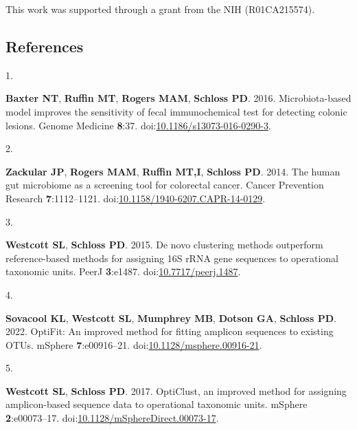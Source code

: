 \documentclass[
]{article}
\newlength{\cslhangindent}
\newlength{\csllabelwidth}
\newlength{\cslentryspacingunit} %
\newenvironment{CSLReferences}[2] %
 {%
  \setlength{\parindent}{0pt}
  \ifodd #1
  \let\oldpar\par
  \def\par{\hangindent=\cslhangindent\oldpar}
  \fi
  \setlength{\parskip}{#2\cslentryspacingunit}
 }%
 {}
\newcommand{\CSLLeftMargin}[1]{\parbox[t]{\csllabelwidth}{#1}}
\newcommand{\CSLRightInline}[1]{\parbox[t]{\linewidth - \csllabelwidth}{#1}\break}
\begin{document}
This work was supported through a grant from the NIH (R01CA215574).

\newpage

\hypertarget{references}{%
\subsection{References}\label{references}}

\setlength{\parindent}{-0.25in}
\setlength{\leftskip}{0.25in}

\noindent

\hypertarget{refs}{}
\begin{CSLReferences}{0}{1}
\leavevmode{}%
\CSLLeftMargin{1. }%
\CSLRightInline{\textbf{Baxter NT}, \textbf{Ruffin MT}, \textbf{Rogers
MAM}, \textbf{Schloss PD}. 2016. Microbiota-based model improves the
sensitivity of fecal immunochemical test for detecting colonic lesions.
Genome Medicine \textbf{8}:37.
doi:\href{https://doi.org/10.1186/s13073-016-0290-3}{10.1186/s13073-016-0290-3}.}

\leavevmode{}%
\CSLLeftMargin{2. }%
\CSLRightInline{\textbf{Zackular JP}, \textbf{Rogers MAM},
\textbf{Ruffin MT,I}, \textbf{Schloss PD}. 2014. The human gut
microbiome as a screening tool for colorectal cancer. Cancer Prevention
Research \textbf{7}:1112--1121.
doi:\href{https://doi.org/10.1158/1940-6207.CAPR-14-0129}{10.1158/1940-6207.CAPR-14-0129}.}

\leavevmode{}%
\CSLLeftMargin{3. }%
\CSLRightInline{\textbf{Westcott SL}, \textbf{Schloss PD}. 2015. De novo
clustering methods outperform reference-based methods for assigning 16S
rRNA gene sequences to operational taxonomic units. PeerJ
\textbf{3}:e1487.
doi:\href{https://doi.org/10.7717/peerj.1487}{10.7717/peerj.1487}.}

\leavevmode{}%
\CSLLeftMargin{4. }%
\CSLRightInline{\textbf{Sovacool KL}, \textbf{Westcott SL},
\textbf{Mumphrey MB}, \textbf{Dotson GA}, \textbf{Schloss PD}. 2022.
OptiFit: An improved method for fitting amplicon sequences to existing
OTUs. mSphere \textbf{7}:e00916--21.
doi:\href{https://doi.org/10.1128/msphere.00916-21}{10.1128/msphere.00916-21}.}

\leavevmode{}%
\CSLLeftMargin{5. }%
\CSLRightInline{\textbf{Westcott SL}, \textbf{Schloss PD}. 2017.
OptiClust, an improved method for assigning amplicon-based sequence data
to operational taxonomic units. mSphere \textbf{2}:e00073--17.
doi:\href{https://doi.org/10.1128/mSphereDirect.00073-17}{10.1128/mSphereDirect.00073-17}.}


\end{CSLReferences}
\end{document}
